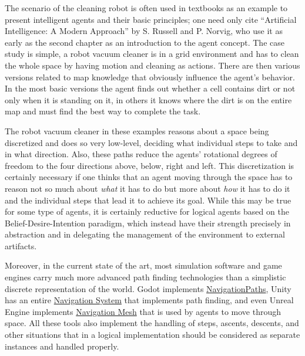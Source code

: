 \label{sec:introduction}
The scenario of the cleaning robot is often used in textbooks as an example to present intelligent agents and their basic principles; one need only cite ``Artificial Intelligence: A Modern Approach''\cite{DBLP:books/aw/RN2020} by S. Russell and P. Norvig, who use it as early as the second chapter as an introduction to the agent concept.
The case study is simple, a robot vacuum cleaner is in a grid environment and has to clean the whole space by having motion and cleaning as actions. There are then various versions related to map knowledge that obviously influence the agent's behavior. In the most basic versions the agent finds out whether a cell contains dirt or not only when it is standing on it, in others it knows where the dirt is on the entire map and must find the best way to complete the task.

The robot vacuum cleaner in these examples reasons about a space being discretized and does so very low-level, deciding what individual steps to take and in what direction.
Also, these paths reduce the agents' rotational degrees of freedom to the four directions above, below, right and left.
This discretization is certainly necessary if one thinks that an agent moving through the space has to reason not so much about \textit{what} it has to do but more about \textit{how} it has to do it and the individual steps that lead it to achieve its goal.
While this may be true for some type of agents, it is certainly reductive for logical agents based on the Belief-Desire-Intention paradigm, which instead have their strength precisely in abstraction and in delegating the management of the environment to external artifacts.

Moreover, in the current state of the art, most simulation software and game engines carry much more advanced path finding technologies than a simplistic discrete representation of the world.
Godot\cite{godot} implements \href{https://docs.godotengine.org/en/stable/tutorials/navigation/navigation_using_navigationpaths.html}{NavigationPaths}, Unity\cite{unity} has an entire \href{https://docs.unity3d.com/2021.3/Documentation/Manual/Navigation.html}{Navigation System} that implements path finding, and even Unreal Engine\cite{unreal} implements \href{https://dev.epicgames.com/documentation/en-us/unreal-engine/basic-navigation-in-unreal-engine}{Navigation Mesh} that is used by agents to move through space.
All these tools also implement the handling of steps, ascents, descents, and other situations that in a logical implementation should be considered as separate instances and handled properly.

